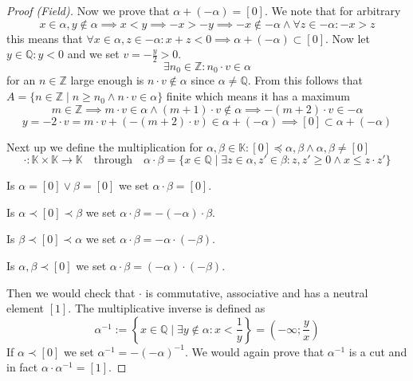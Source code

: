 \documentclass[english,titlepage]{uzhpub}
\theoremstyle{definition}
\theoremstyle{plain}
\theoremstyle{remark}
\theoremstyle{example}
\begin{document}
\begin{proof}[Proof (Field)]
      Now we prove that \(\alpha + (-\alpha) = [0]\).
      We note that for arbitrary
      \[x \in \alpha, y \not\in \alpha \implies x < y \implies -x > -y \implies -x \not\in -\alpha \land \forall z \in -\alpha: -x > z\]
      this means that \(\forall x \in \alpha, z \in -\alpha: x + z < 0 \implies \alpha + (-\alpha) \subset [0]\).
      Now let \(y \in \mathbb{Q}: y < 0\) and we set \(v = -\frac{y}{2} > 0\).
      \[\exists n_0 \in \mathbb{Z}: n_0 \cdot v \in \alpha\]
      for an \(n \in \mathbb{Z}\) large enough is \(n \cdot v \not\in \alpha\) since \(\alpha \neq \mathbb{Q}\).
      From this follows that \(A = \{n \in \mathbb{Z} \mid n \geq n_0 \land n \cdot v \in \alpha\}\) finite which means it has a maximum
      \[m \in \mathbb{Z} \implies m \cdot v \in \alpha \land (m + 1) \cdot v \not\in \alpha \implies -(m + 2) \cdot v \in -\alpha\]
      \[y = -2 \cdot v = m \cdot v + (-(m + 2) \cdot v) \in \alpha + (-\alpha) \implies [0] \subset \alpha + (-\alpha)\]

      Next up we define the multiplication for \(\alpha, \beta \in \mathbb{K}: [0] \preceq \alpha, \beta \land \alpha, \beta \neq [0]\)
      \[\cdot: \mathbb{K} \times \mathbb{K} \to \mathbb{K} \quad\text{through}\quad \alpha \cdot \beta = \{x \in \mathbb{Q} \mid \exists z \in \alpha, z' \in \beta: z, z' \geq 0 \land x \leq z \cdot z'\}\]

      Is \(\alpha = [0] \lor \beta = [0]\) we set \(\alpha \cdot \beta = [0]\).

      Is \(\alpha \prec [0] \prec \beta\) we set \(\alpha \cdot \beta = -(-\alpha) \cdot \beta\).

      Is \(\beta \prec [0] \prec \alpha\) we set \(\alpha \cdot \beta = -\alpha \cdot (-\beta)\).

      Is \(\alpha, \beta \prec [0]\) we set \(\alpha \cdot \beta = (-\alpha) \cdot (-\beta)\).

      Then we would check that \(\cdot\) is commutative, associative and has a neutral element \([1]\).
      The multiplicative inverse is defined as
      \[\alpha^{-1} := \left\{x \in \mathbb{Q} \mid \exists y \not\in \alpha: x < \frac{1}{y}\right\} = \left(-\infty; \frac{y}{x}\right)\]
      If \(\alpha \prec [0]\) we set \(\alpha^{-1} = -(-\alpha)^{-1}\).
      We would again prove that \(\alpha^{-1}\) is a cut and in fact \(\alpha \cdot \alpha^{-1} = [1]\).


\end{proof}
\end{document}
